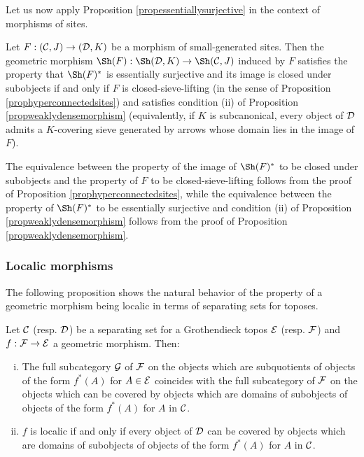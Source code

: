\documentclass[a4paper,12pt]{article}
\begin{document}
Let us now apply Proposition \ref{propessentiallysurjective} in the context of morphisms of sites.

\begin{proposition}\label{propessentialsurjectivitysites}
	Let $F:({\cal C}, J)\to ({\cal D}, K)$ be a morphism of small-generated sites. Then the geometric morphism $\Sh(F):\Sh({\cal D}, K) \to \Sh({\cal C}, J)$ induced by $F$ satisfies the property that $\Sh(F)^{\ast}$ is essentially surjective and its image is closed under subobjects if and only if $F$ is closed-sieve-lifting (in the sense of Proposition \ref{prophyperconnectedsites}) and satisfies condition (ii) of Proposition \ref{propweaklydensemorphism} (equivalently, if $K$ is subcanonical, every object of $\cal D$ admits a $K$-covering sieve generated by arrows whose domain lies in the image of $F$).
\end{proposition}

\begin{proofs}
	The equivalence between the property of the image of $\Sh(F)^{\ast}$ to be closed under subobjects and the property of $F$ to be closed-sieve-lifting follows from the proof of Proposition \ref{prophyperconnectedsites}, while the equivalence between the property of $\Sh(F)^{\ast}$ to be essentially surjective and condition (ii) of Proposition \ref{propweaklydensemorphism} follows from the proof of Proposition \ref{propweaklydensemorphism}.
\end{proofs}

\subsubsection{Localic morphisms}

The following proposition shows the natural behavior of the property of a geometric morphism being localic in terms of separating sets for toposes.

\begin{proposition}\label{proplocalic}
	Let ${\cal C}$ (resp. $\cal D$) be a separating set for a Grothendieck topos $\cal E$ (resp. $\cal F$) and $f:{\cal F}\to {\cal E}$ a geometric morphism.
	Then: 
	\begin{enumerate}[(i)]
		\item The full subcategory $\cal G$ of $\cal F$ on the objects which are subquotients of objects of the form $f^{\ast}(A)$ for $A\in {\cal E}$ coincides with the full subcategory of $\cal F$ on the objects which can be covered by objects which are domains of subobjects of objects of the form $f^{\ast}(A)$ for $A$ in $\cal C$. 
		
		\item $f$ is localic if and only if every object of $\cal D$ can be covered by objects which are domains of subobjects of objects of the form $f^{\ast}(A)$ for $A$ in $\cal C$. 
	\end{enumerate}	
\end{proposition}
\end{document}
